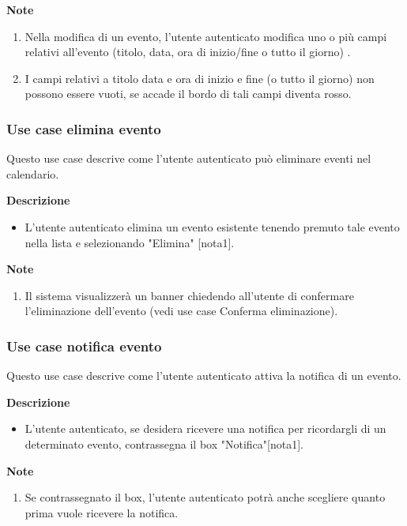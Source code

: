 \documentclass[a4paper,12pt]{article}
\begin{document}
\textbf{Note}
\begin{enumerate} \setlength\itemsep{0.01em}
\item Nella modifica di un evento, l'utente autenticato modifica uno o più campi relativi all'evento (titolo, data, ora di inizio/fine o tutto il giorno) .
\item I campi relativi a titolo data e ora di inizio e fine (o tutto il giorno) non possono essere vuoti, se accade il bordo di tali campi diventa rosso.
\end{enumerate}




\subsubsection*{Use case elimina evento}

Questo use case descrive come l'utente autenticato può eliminare eventi nel calendario.


\textbf{Descrizione}
\begin{itemize} \setlength\itemsep{0.01em}
\item L'utente autenticato elimina un evento esistente tenendo premuto tale evento nella lista e selezionando "Elimina"  [nota1].
\end{itemize}

\textbf{Note}
\begin{enumerate} \setlength\itemsep{0.01em}
\item Il sistema visualizzerà un banner chiedendo all'utente di confermare l'eliminazione dell'evento  (vedi use case Conferma eliminazione).
\end{enumerate}




\subsubsection*{Use case notifica evento}

Questo use case descrive come l'utente autenticato attiva la notifica di un evento.

\textbf{Descrizione}
\begin{itemize} \setlength\itemsep{0.01em}
\item L'utente autenticato, se desidera ricevere una notifica per ricordargli di un determinato evento, contrassegna il box "Notifica"[nota1].
\end{itemize}

\textbf{Note}
\begin{enumerate} \setlength\itemsep{0.01em}
\item Se contrassegnato il box, l'utente autenticato potrà anche scegliere quanto prima vuole ricevere la notifica.
\end{enumerate}
\end{document}
